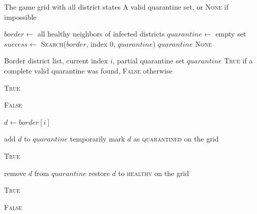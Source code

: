 \documentclass[conference]{IEEEtran}
\begin{document}
\begin{algorithm}[H]
\caption{Backtracking Quarantine — Entry Point}
\label{alg:bt_main}
\begin{algorithmic}[1]
\REQUIRE The game grid with all district states
\ENSURE A valid quarantine set, or \textsc{None} if impossible

\STATE $\mathit{border} \leftarrow$ all healthy neighbors of infected districts
\STATE $\mathit{quarantine} \leftarrow$ empty set
\STATE $\mathit{success} \leftarrow$
       \textsc{Search}($\mathit{border}$, index $0$, $\mathit{quarantine}$)
  \RETURN $\mathit{quarantine}$
\ELSE
  \RETURN \textsc{None}
\ENDIF
\end{algorithmic}
\end{algorithm}
\vspace{-5pt}
\begin{algorithm}[H]
\caption{Search — Recursive Backtracking Step}
\label{alg:bt_worker}
\begin{algorithmic}[1]
\REQUIRE Border district list, current index $i$,
         partial quarantine set $\mathit{quarantine}$
\ENSURE \textsc{True} if a complete valid quarantine was found,
        \textsc{False} otherwise

  \RETURN \textsc{True}
\ENDIF

  \RETURN \textsc{False}
\ENDIF

\STATE $d \leftarrow \mathit{border}[i]$

\STATE add $d$ to $\mathit{quarantine}$
\STATE temporarily mark $d$ as \textsc{quarantined} on the grid

    \RETURN \textsc{True}
  \ENDIF
\ENDIF

\STATE remove $d$ from $\mathit{quarantine}$
\STATE restore $d$ to \textsc{healthy} on the grid

  \RETURN \textsc{True}
\ENDIF

\RETURN \textsc{False}
\end{algorithmic}
\end{algorithm}
\end{document}
